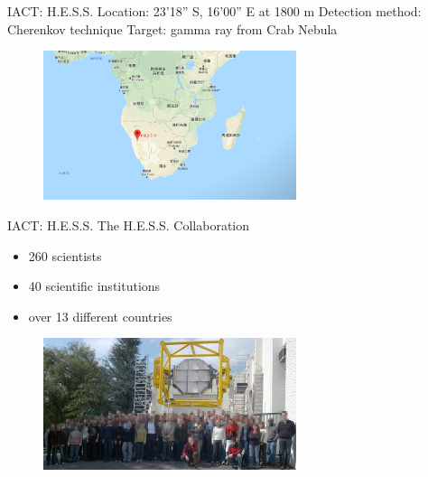 \documentclass{beamer}
\begin{document}
\begin{frame}{IACT: H.E.S.S.}
	Location: 23'18'' S, 16'00'' E at 1800 m
	\newline
	Detection method: Cherenkov technique
	\newline
	Target: gamma ray from Crab Nebula
	\begin{figure}[h]
		\includegraphics[width=280px]{HESS_location.png}
	\end{figure}
\end{frame}


\begin{frame}{IACT: H.E.S.S.}
	The H.E.S.S. Collaboration
	\begin{itemize}
		\item 260 scientists
		\item 40 scientific institutions
		\item over 13 different countries
	\end{itemize}
	\begin{figure}[h]
		\includegraphics[width=280px]{hess_collaboration.jpg}
	\end{figure}
\end{frame}
\end{document}
